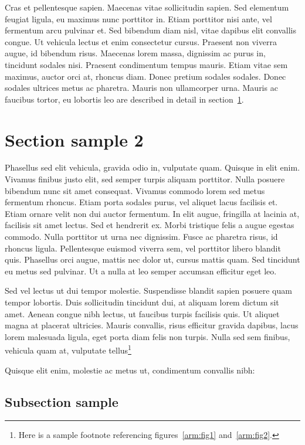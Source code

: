 Cras et pellentesque sapien. Maecenas vitae sollicitudin sapien. Sed elementum feugiat ligula, eu maximus nunc porttitor in. Etiam porttitor nisi ante, vel fermentum arcu pulvinar et. Sed bibendum diam nisl, vitae dapibus elit convallis congue. Ut vehicula lectus et enim consectetur cursus. Praesent non viverra augue, id bibendum risus. Maecenas lorem massa, dignissim ac purus in, tincidunt sodales nisi. Praesent condimentum tempus mauris. Etiam vitae sem maximus, auctor orci at, rhoncus diam. Donec pretium sodales sodales. Donec sodales ultrices metus ac pharetra. Mauris non ullamcorper urna. Mauris ac faucibus tortor, eu lobortis leo are described in detail in section~\ref{ch1:sec}.

\section{Section sample 2}\label{ch1:sec}

Phasellus sed elit vehicula, gravida odio in, vulputate quam. Quisque in elit enim. Vivamus finibus justo elit, sed semper turpis aliquam porttitor. Nulla posuere bibendum nunc sit amet consequat. Vivamus commodo lorem sed metus fermentum rhoncus. Etiam porta sodales purus, vel aliquet lacus facilisis et. Etiam ornare velit non dui auctor fermentum. In elit augue, fringilla at lacinia at, facilisis sit amet lectus. Sed et hendrerit ex. Morbi tristique felis a augue egestas commodo. Nulla porttitor ut urna nec dignissim. Fusce ac pharetra risus, id rhoncus ligula. Pellentesque euismod viverra sem, vel porttitor libero blandit quis. Phasellus orci augue, mattis nec dolor ut, cursus mattis quam. Sed tincidunt eu metus sed pulvinar. Ut a nulla at leo semper accumsan efficitur eget leo.

Sed vel lectus ut dui tempor molestie. Suspendisse blandit sapien posuere quam tempor lobortis. Duis sollicitudin tincidunt dui, at aliquam lorem dictum sit amet. Aenean congue nibh lectus, ut faucibus turpis facilisis quis. Ut aliquet magna at placerat ultricies. Mauris convallis, risus efficitur gravida dapibus, lacus lorem malesuada ligula, eget porta diam felis non turpis. Nulla sed sem finibus, vehicula quam at, vulputate tellus\footnote{Here is a sample footnote referencing figures~\ref{arm:fig1}
and~\ref{arm:fig2}.}  

Quisque elit enim, molestie ac metus ut, condimentum convallis nibh:

\subsection{Subsection sample}

